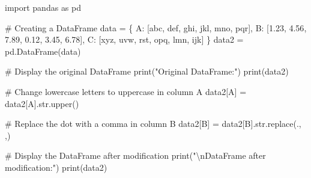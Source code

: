 \documentclass[
  english,
  letterpaper,
  DIV=11,
  numbers=noendperiod]{scrreprt}
\newenvironment{Shaded}{\begin{snugshade}}{\end{snugshade}}
\newcommand{\BuiltInTok}[1]{\textcolor[rgb]{0.00,0.23,0.31}{#1}}
\newcommand{\CharTok}[1]{\textcolor[rgb]{0.13,0.47,0.30}{#1}}
\newcommand{\CommentTok}[1]{\textcolor[rgb]{0.37,0.37,0.37}{#1}}
\newcommand{\ImportTok}[1]{\textcolor[rgb]{0.00,0.46,0.62}{#1}}
\newcommand{\NormalTok}[1]{\textcolor[rgb]{0.00,0.23,0.31}{#1}}
\newcommand{\OperatorTok}[1]{\textcolor[rgb]{0.37,0.37,0.37}{#1}}
\newcommand{\StringTok}[1]{\textcolor[rgb]{0.13,0.47,0.30}{#1}}
\begin{document}
\begin{Shaded}
\begin{Highlighting}[]
\ImportTok{import}\NormalTok{ pandas }\ImportTok{as}\NormalTok{ pd}

\CommentTok{\# Creating a DataFrame}
\NormalTok{data }\OperatorTok{=}\NormalTok{ \{}
    \StringTok{\textquotesingle{}A\textquotesingle{}}\NormalTok{: [}\StringTok{\textquotesingle{}abc\textquotesingle{}}\NormalTok{, }\StringTok{\textquotesingle{}def\textquotesingle{}}\NormalTok{, }\StringTok{\textquotesingle{}ghi\textquotesingle{}}\NormalTok{, }\StringTok{\textquotesingle{}jkl\textquotesingle{}}\NormalTok{, }\StringTok{\textquotesingle{}mno\textquotesingle{}}\NormalTok{, }\StringTok{\textquotesingle{}pqr\textquotesingle{}}\NormalTok{],}
    \StringTok{\textquotesingle{}B\textquotesingle{}}\NormalTok{: [}\StringTok{\textquotesingle{}1.23\textquotesingle{}}\NormalTok{, }\StringTok{\textquotesingle{}4.56\textquotesingle{}}\NormalTok{, }\StringTok{\textquotesingle{}7.89\textquotesingle{}}\NormalTok{, }\StringTok{\textquotesingle{}0.12\textquotesingle{}}\NormalTok{, }\StringTok{\textquotesingle{}3.45\textquotesingle{}}\NormalTok{, }\StringTok{\textquotesingle{}6.78\textquotesingle{}}\NormalTok{],}
    \StringTok{\textquotesingle{}C\textquotesingle{}}\NormalTok{: [}\StringTok{\textquotesingle{}xyz\textquotesingle{}}\NormalTok{, }\StringTok{\textquotesingle{}uvw\textquotesingle{}}\NormalTok{, }\StringTok{\textquotesingle{}rst\textquotesingle{}}\NormalTok{, }\StringTok{\textquotesingle{}opq\textquotesingle{}}\NormalTok{, }\StringTok{\textquotesingle{}lmn\textquotesingle{}}\NormalTok{, }\StringTok{\textquotesingle{}ijk\textquotesingle{}}\NormalTok{]}
\NormalTok{\}}
\NormalTok{data2 }\OperatorTok{=}\NormalTok{ pd.DataFrame(data)}

\CommentTok{\# Display the original DataFrame}
\BuiltInTok{print}\NormalTok{(}\StringTok{"Original DataFrame:"}\NormalTok{)}
\BuiltInTok{print}\NormalTok{(data2)}

\CommentTok{\# Change lowercase letters to uppercase in column \textquotesingle{}A\textquotesingle{}}
\NormalTok{data2[}\StringTok{\textquotesingle{}A\textquotesingle{}}\NormalTok{] }\OperatorTok{=}\NormalTok{ data2[}\StringTok{\textquotesingle{}A\textquotesingle{}}\NormalTok{].}\BuiltInTok{str}\NormalTok{.upper()}

\CommentTok{\# Replace the dot with a comma in column \textquotesingle{}B\textquotesingle{}}
\NormalTok{data2[}\StringTok{\textquotesingle{}B\textquotesingle{}}\NormalTok{] }\OperatorTok{=}\NormalTok{ data2[}\StringTok{\textquotesingle{}B\textquotesingle{}}\NormalTok{].}\BuiltInTok{str}\NormalTok{.replace(}\StringTok{\textquotesingle{}.\textquotesingle{}}\NormalTok{, }\StringTok{\textquotesingle{},\textquotesingle{}}\NormalTok{)}

\CommentTok{\# Display the DataFrame after modification}
\BuiltInTok{print}\NormalTok{(}\StringTok{"}\CharTok{\textbackslash{}n}\StringTok{DataFrame after modification:"}\NormalTok{)}
\BuiltInTok{print}\NormalTok{(data2)}
\end{Highlighting}
\end{Shaded}
\end{document}
